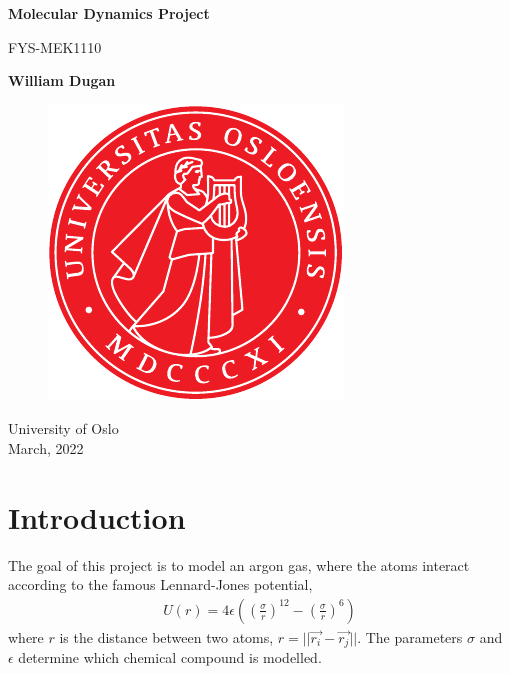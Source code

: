 \documentclass[a4paper,10pt,english]{article}
\begin{document}
\begin{titlepage}
    \begin{center}
        \vspace*{1cm}
            
        \Huge
        \textbf{Molecular Dynamics Project}
            
        \vspace{0.5cm}
        \LARGE
        FYS-MEK1110
            
        \vspace{1.5cm}
            
        \textbf{William Dugan}
            
        \vfill
    
        \begin{figure}[h!] 
            \centering 
            \includegraphics[scale=.7]{../figures/uio_logo.pdf} 
        \end{figure}    
        
        \Large
        University of Oslo\\
        March, 2022
    \end{center}
\end{titlepage}

\newpage
{
  \tableofcontents
}

\newpage

\section{Introduction} \label{1}

The goal of this project is to model an argon gas, where the atoms interact according to the famous Lennard-Jones potential,
\begin{align} \label{eq:1}
    U(r) = 4 \epsilon 
    \left(
        \left( 
            \frac{\sigma}{r}
        \right)^{12} 
        - \left(
            \frac{\sigma}{r}
        \right)^6
    \right)
\end{align}
where $r$ is the distance between two atoms, $r=||\Vec{r_i}-\Vec{r_j}||$. The parameters $\sigma$ and $\epsilon$ determine which chemical compound is modelled.
\end{document}
